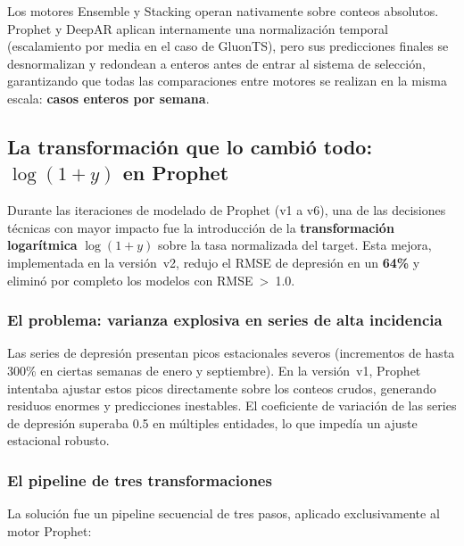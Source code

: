 \documentclass[12pt, letterpaper]{article}
\begin{document}
Los motores Ensemble y Stacking operan nativamente sobre conteos absolutos. Prophet y DeepAR aplican internamente una normalización temporal (escalamiento por media en el caso de GluonTS), pero sus predicciones finales se desnormalizan y redondean a enteros antes de entrar al sistema de selección, garantizando que todas las comparaciones entre motores se realizan en la misma escala: \textbf{casos enteros por semana}.

\subsection{La transformación que lo cambió todo: \texorpdfstring{$\log(1+y)$}{log(1+y)} en Prophet}

Durante las iteraciones de modelado de Prophet (v1 a v6), una de las decisiones técnicas con mayor impacto fue la introducción de la \textbf{transformación logarítmica} $\log(1+y)$ sobre la tasa normalizada del target. Esta mejora, implementada en la versión~v2, redujo el RMSE de depresión en un \textbf{64\%} y eliminó por completo los modelos con RMSE~>~1.0.

\subsubsection*{El problema: varianza explosiva en series de alta incidencia}

Las series de depresión presentan picos estacionales severos (incrementos de hasta 300\% en ciertas semanas de enero y septiembre). En la versión~v1, Prophet intentaba ajustar estos picos directamente sobre los conteos crudos, generando residuos enormes y predicciones inestables. El coeficiente de variación de las series de depresión superaba 0.5 en múltiples entidades, lo que impedía un ajuste estacional robusto.

\subsubsection*{El pipeline de tres transformaciones}

La solución fue un pipeline secuencial de tres pasos, aplicado exclusivamente al motor Prophet:
\end{document}
